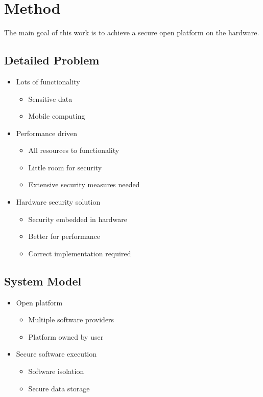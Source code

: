 \documentclass{report}
\begin{document}
\chapter{Method}

The main goal of this work is to achieve a secure open platform on the hardware.

\section{Detailed Problem}

\begin{itemize}
\item Lots of functionality \begin{itemize}
\item Sensitive data
\item Mobile computing
\end{itemize}
\item Performance driven \begin{itemize}
\item All resources to functionality
\item Little room for security
\item Extensive security measures needed
\end{itemize}
\item Hardware security solution \begin{itemize}
\item Security embedded in hardware
\item Better for performance
\item Correct implementation required
\end{itemize}
\end{itemize}

\section{System Model}

\begin{itemize}
\item Open platform \begin{itemize}
\item Multiple software providers
\item Platform owned by user
\end{itemize}
\item Secure software execution \begin{itemize}
\item Software isolation
\item Secure data storage
\end{itemize}
\end{itemize}
\end{document}
